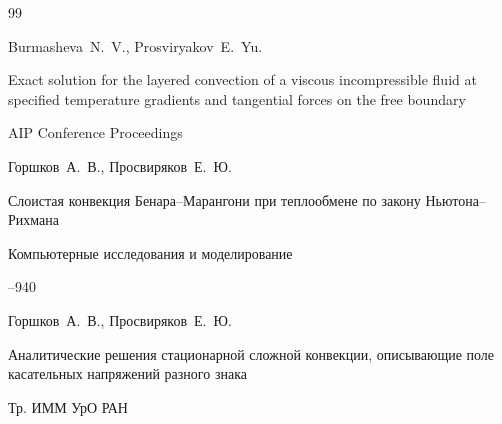 \begin{thebibliography}{99}

\by Burmasheva~N.~V.,  Prosviryakov~E.~Yu.

\paper Exact solution for the layered convection of a viscous incompressible fluid at specified temperature gradients and tangential forces on the free boundary

\jour AIP Conference Proceedings












\by Горшков~А.~В., Просвиряков~Е.~Ю.

\paper Слоистая конвекция Бенара--Марангони при теплообмене по закону Ньютона--Рихмана

\jour Компьютерные исследования и моделирование




--940















\by Горшков~А.~В., Просвиряков~Е.~Ю.

\paper Аналитические решения стационарной сложной конвекции, описывающие поле касательных напряжений разного знака

\serial Тр. ИММ УрО РАН



\end{thebibliography}

